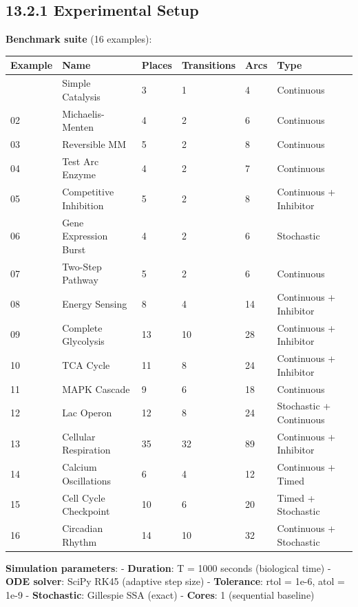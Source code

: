 \hypertarget{experimental-setup}{%
\subsection{13.2.1 Experimental Setup}\label{experimental-setup}}

\textbf{Benchmark suite} (16 examples):

\begin{longtable}[]{@{}llllll@{}}
\toprule\noalign{}
Example & Name & Places & Transitions & Arcs & Type \\
\midrule\noalign{}
\endhead
\bottomrule\noalign{}
\endlastfoot
01 & Simple Catalysis & 3 & 1 & 4 & Continuous \\
02 & Michaelis-Menten & 4 & 2 & 6 & Continuous \\
03 & Reversible MM & 5 & 2 & 8 & Continuous \\
04 & Test Arc Enzyme & 4 & 2 & 7 & Continuous \\
05 & Competitive Inhibition & 5 & 2 & 8 & Continuous + Inhibitor \\
06 & Gene Expression Burst & 4 & 2 & 6 & Stochastic \\
07 & Two-Step Pathway & 5 & 2 & 6 & Continuous \\
08 & Energy Sensing & 8 & 4 & 14 & Continuous + Inhibitor \\
09 & Complete Glycolysis & 13 & 10 & 28 & Continuous + Inhibitor \\
10 & TCA Cycle & 11 & 8 & 24 & Continuous + Inhibitor \\
11 & MAPK Cascade & 9 & 6 & 18 & Continuous \\
12 & Lac Operon & 12 & 8 & 24 & Stochastic + Continuous \\
13 & Cellular Respiration & 35 & 32 & 89 & Continuous + Inhibitor \\
14 & Calcium Oscillations & 6 & 4 & 12 & Continuous + Timed \\
15 & Cell Cycle Checkpoint & 10 & 6 & 20 & Timed + Stochastic \\
16 & Circadian Rhythm & 14 & 10 & 32 & Continuous + Stochastic \\
\end{longtable}

\textbf{Simulation parameters}: - \textbf{Duration}: T = 1000 seconds
(biological time) - \textbf{ODE solver}: SciPy RK45 (adaptive step size)
- \textbf{Tolerance}: rtol = 1e-6, atol = 1e-9 - \textbf{Stochastic}:
Gillespie SSA (exact) - \textbf{Cores}: 1 (sequential baseline)

